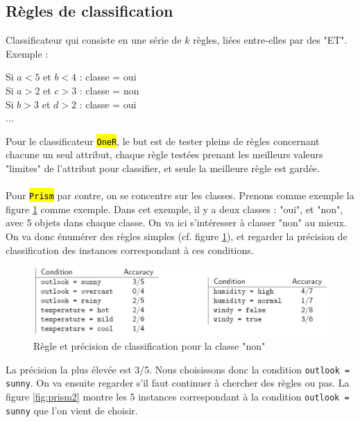 \documentclass[letterpaper, 12pt]{article}
\newcommand{\alinea}{
\hspace*{0.5cm}}
\begin{document}
		\subsection{Règles de classification}
			\alinea Classificateur qui consiste en une série de $k$ 
				règles, liées entre-elles par des "ET".\\				
			\alinea Exemple :
				\begin{center}
					Si $a < 5$ et $b < 4$ : classe = oui\\
					Si $a > 2$ et $c > 3$ : classe = non\\
					Si $b > 3$ et $d > 2$ : classe = oui\\
					...
				\end{center}
			\alinea Pour le classificateur \hl{\texttt{OneR}}, le but est
				de tester pleins de règles concernant chacune un seul
				attribut, chaque règle testées prenant les meilleurs
				valeurs "limites" de l'attribut pour classifier, et seule
				la meilleure règle est gardée.\\
			~\\
			\alinea Pour \hl{\texttt{Prism}} par contre, on se concentre 
				sur les classes. Prenons comme exemple la figure 
				\ref{fig:prism} comme exemple. Dans cet exemple, il y 
				a deux classes : "oui", et "non", avec 5 objets dans 
				chaque classe. On va ici s'intéresser 
				à classer "non" au mieux. On va donc énumérer des
				règles simples (cf. figure \ref{fig:prism}), et 
				regarder la précision de classification des instances
				correspondant à ces conditions.
			\begin{figure}[H]
				\centering
				\includegraphics[scale=0.4]{Images/prism.png}
				\caption{Règle et précision de classification pour la classe
						 "non"}
				\label{fig:prism}
			\end{figure}\noindent
			\alinea La précision la plus élevée est 3/5. Nous choisissons
				donc la condition \texttt{outlook = sunny}. On va ensuite 
				regarder s'il faut continuer à chercher des règles ou pas.
				La figure \ref{fig:prism2} montre les 5 instances
				correspondant à la condition \texttt{outlook = sunny}
				que l'on vient de choisir.
\end{document}
